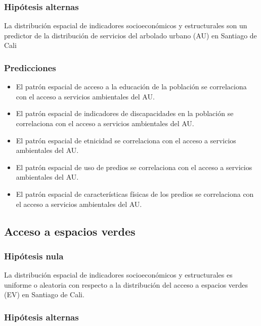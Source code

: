 \documentclass[12pt,a4paper,openany]{book}
\providecommand{\tightlist}{%
  \setlength{\itemsep}{0pt}\setlength{\parskip}{0pt}}
\theoremstyle{definition}
\theoremstyle{definition}
\theoremstyle{definition}
\theoremstyle{remark}
\begin{document}
\subsubsection{Hipótesis alternas}\label{hipotesis-alternas}

La distribución espacial de indicadores socioeconómicos y estructurales
son un predictor de la distribución de servicios del arbolado urbano
(AU) en Santiago de Cali

\subsubsection{Predicciones}\label{predicciones}

\begin{itemize}
\tightlist
\item
  El patrón espacial de acceso a la educación de la población se
  correlaciona con el acceso a servicios ambientales del AU.
\item
  El patrón espacial de indicadores de discapacidades en la población se
  correlaciona con el acceso a servicios ambientales del AU.
\item
  El patrón espacial de etnicidad se correlaciona con el acceso a
  servicios ambientales del AU.
\item
  El patrón espacial de uso de predios se correlaciona con el acceso a
  servicios ambientales del AU.
\item
  El patrón espacial de características físicas de los predios se
  correlaciona con el acceso a servicios ambientales del AU.
\end{itemize}

\subsection{Acceso a espacios verdes}\label{acceso-a-espacios-verdes}

\subsubsection{Hipótesis nula}\label{hipotesis-nula-1}

La distribución espacial de indicadores socioeconómicos y estructurales
es uniforme o aleatoria con respecto a la distribución del acceso a
espacios verdes (EV) en Santiago de Cali.

\subsubsection{Hipótesis alternas}\label{hipotesis-alternas-1}
\end{document}
